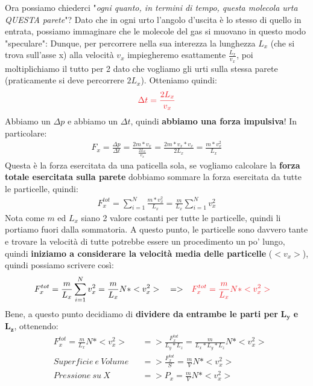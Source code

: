                     Ora possiamo chiederci "\textit{ogni quanto, in termini di tempo, questa molecola urta QUESTA parete}"? Dato che in ogni urto l'angolo d'uscita è lo stesso di quello in entrata, possiamo immaginare che le molecole del gas si muovano in questo modo "speculare":
                    Dunque, per percorrere nella sua interezza la lunghezza $L_x$ (che si trova sull'asse x) alla velocità $v_x$ impiegheremo esattamente $\frac{L_x}{v_x}$, poi moltiplichiamo il tutto per 2 dato che vogliamo gli urti sulla stessa parete (praticamente si deve percorrere $2L_x$). Otteniamo quindi:
                    \begin{align*}
                        \textcolor{Red}{\Delta t = \frac{2L_x}{v_x}}
                    \end{align*}
                    Abbiamo un $\Delta p$ e abbiamo un $\Delta t$, quindi \textbf{abbiamo una forza impulsiva}! In particolare:
                    \begin{align*}
                        F_x=\frac{\Delta p}{\Delta t}= \frac{2m*v_{x}}{\frac{2L_x}{v_x}} = \frac{2m*v_{x}*v_{x}}{2L_x}= \frac{m*v_{x}^2}{L_x}
                    \end{align*}
                    Questa è la forza esercitata da una paticella sola, se vogliamo calcolare la \textbf{forza totale esercitata sulla parete} dobbiamo sommare la forza esercitata da tutte le particelle, quindi:
                    \begin{align*}
                        F_x^{tot}=\sum_{i=1}^N  \frac{m*v_{x}^2}{L_x}=  \frac{m}{L_x}\sum_{i=1}^Nv_{x}^2
                    \end{align*}
                    Nota come $m$ ed $L_x$ siano 2 valore costanti per tutte le particelle, quindi li portiamo fuori dalla sommatoria. A questo punto, le particelle sono davvero tante e trovare la velocità di tutte potrebbe essere un procedimento un po' lungo, quindi \textbf{iniziamo a considerare la velocità media delle particelle} ($<v_x>$), quindi possiamo scrivere così:
                    \begin{align*}
                        &F_x^{tot}=\frac{m}{L_x}\sum_{i=1}^Nv_{x}^2=\frac{m}{L_x}N*<v_{x}^2>&&=>&&\textcolor{Red}{F_x^{tot}=\frac{m}{L_x}N*<v_{x}^2>}
                    \end{align*}
                    Bene, a questo punto decidiamo di \textbf{dividere da entrambe le parti per} $\mathbf{L_y}$ \textbf{e} $\mathbf{L_z}$, ottenendo:
                    \begin{align*}
                        &F_x^{tot}=\frac{m}{L_x}N*<v_{x}^2> &&=>\frac{F_x^{tot}}{L_y*L_z}=\frac{m}{L_x*L_y*L_z}N*<v_{x}^2>\\
                        & Superficie\ e\ Volume&&=>\frac{F_x^{tot}}{S}=\frac{m}{V}N*<v_{x}^2>\\
                        &Pressione\ su\ X&&=>P_x=\frac{m}{V}N*<v_{x}^2>
                    \end{align*}
